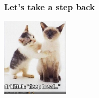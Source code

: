 \begin{frame}[fragile]
\frametitle{Let's take a step back}
\begin{center}
\includegraphics[height=3.8cm]{image/deep-breaf.jpg}
\end{center}
\end{frame}
